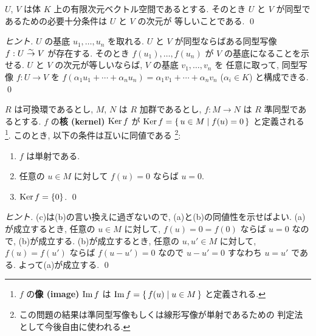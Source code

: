 \documentclass[12pt,twoside]{jarticle}
\begin{document}

\begin{question}[ベクトル空間の同型性と次元の関係]
  $U$, $V$ は体 $K$ 上の有限次元ベクトル空間であるとする.
  そのとき $U$ と $V$ が同型であるための必要十分条件は $U$ と $V$ の次元が
  等しいことである. \qed
\end{question}

\begin{proof}[ヒント]
  $U$ の基底 $u_1,\ldots,u_n$ を取れる.
  $U$ と $V$ が同型ならばある同型写像 $f:U\overset\sim\rightarrow V$ が存在する.
  そのとき $f(u_1),\ldots,f(u_n)$ が $V$ の基底になることを示せる.
  $U$ と $V$ の次元が等しいならば,  $V$ の基底 $v_1,\ldots,v_n$ を
  任意に取って, 同型写像 $f:U\to V$ を $f(\alpha_1u_1+\cdots+\alpha_nu_n)
  = \alpha_1 v_1+\cdots+\alpha_n v_n$ ($\alpha_i\in K$) と構成できる.
  \qed
\end{proof}


\begin{question}
  $R$ は可換環であるとし, $M$, $N$ は $R$ 加群であるとし, 
  $f:M\to N$ は $R$ 準同型であるとする.
  $f$ の{\bf 核 (kernel)} $\mathop{\mathrm{Ker}}\nolimits f$ が %
  $\mathop{\mathrm{Ker}}\nolimits f = \{\, u\in M \mid f(u) = 0 \,\}$ と定義される%
  \footnote{$f$ の{\bf 像 (image)} $\mathop{\mathrm{Im}}\nolimits f$ は %
    $\mathop{\mathrm{Im}}\nolimits f = \{\,f(u)\mid u\in M\,\}$ と定義される.}.  
  このとき, 以下の条件は互いに同値である%
  \footnote{この問題の結果は準同型写像もしくは線形写像が単射であるための
    判定法として今後自由に使われる.}:
  \begin{enumerate}
  \item[(a)] $f$ は単射である.
  \item[(b)] 任意の $u\in M$ に対して $f(u)=0$ ならば $u=0$.
  \item[(c)] $\mathop{\mathrm{Ker}}\nolimits f =\{0\}$.
    \qed
  \end{enumerate}
\end{question}

\begin{proof}[ヒント]
  (c)は(b)の言い換えに過ぎないので, (a)と(b)の同値性を示せばよい.
  (a)が成立するとき, 任意の $u\in M$ に対して, %
  $f(u)=0=f(0)$ ならば $u=0$ なので, (b)が成立する.
  (b)が成立するとき, 任意の $u,u'\in M$ に対して, %
  $f(u)=f(u')$ ならば $f(u-u')=0$ なので $u-u'=0$ すなわち $u=u'$ である.
  よって(a)が成立する.
  \qed
\end{proof}

\end{document}

